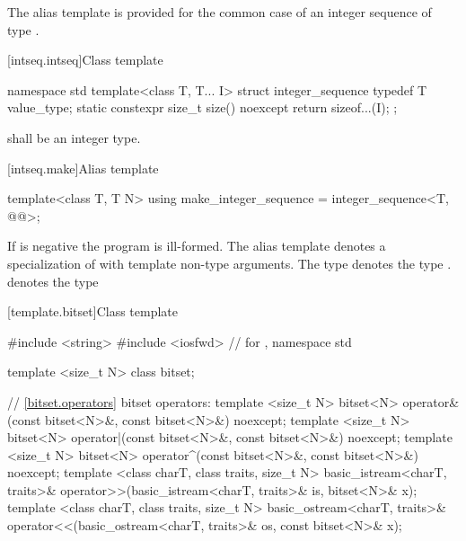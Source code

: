 \exitexample
\enternote
The  alias template is provided for the common case of
an integer sequence of type .
\exitnote

[intseq.intseq]{Class template }

%
\begin{codeblock}
namespace std {
  template<class T, T... I>
  struct integer_sequence {
    typedef T value_type;
    static constexpr size_t size() noexcept { return sizeof...(I); }
  };
}
\end{codeblock}

\pnum
{} shall be an integer type.

[intseq.make]{Alias template }

%
\begin{itemdecl}
template<class T, T N>
  using make_integer_sequence = integer_sequence<T, @\seebelow{}@>;
\end{itemdecl}

\begin{itemdescr}
\pnum
If  is negative the program is ill-formed. The alias template
 denotes a specialization of
 with  template non-type arguments.
The type  denotes the type
.
\enternote {} denotes the type
 \exitnote
\end{itemdescr}

[template.bitset]{Class template }%

%

\begin{codeblock}
#include <string>
#include <iosfwd>               // for , 
namespace std {
  template <size_t N> class bitset;

  // \ref{bitset.operators} bitset operators:
  template <size_t N>
    bitset<N> operator&(const bitset<N>&, const bitset<N>&) noexcept;
  template <size_t N>
    bitset<N> operator|(const bitset<N>&, const bitset<N>&) noexcept;
  template <size_t N>
    bitset<N> operator^(const bitset<N>&, const bitset<N>&) noexcept;
  template <class charT, class traits, size_t N>
    basic_istream<charT, traits>&
    operator>>(basic_istream<charT, traits>& is, bitset<N>& x);
  template <class charT, class traits, size_t N>
    basic_ostream<charT, traits>&
    operator<<(basic_ostream<charT, traits>& os, const bitset<N>& x);
}
\end{codeblock}

